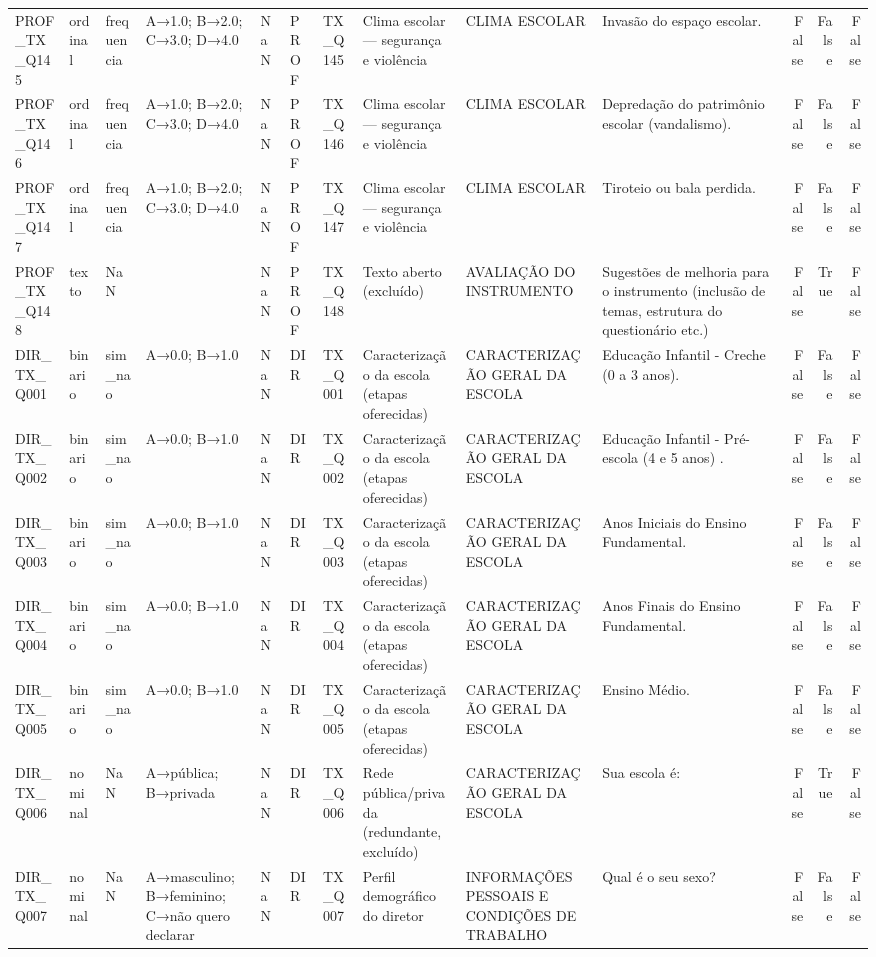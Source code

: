 \begin{tabular}{llllllllllrrr}
PROF\_TX\_Q145 & ordinal & frequencia & A→1.0; B→2.0; C→3.0; D→4.0 & NaN & PROF & TX\_Q145 & Clima escolar — segurança e violência & CLIMA ESCOLAR & Invasão do espaço escolar. & False & False & False \\
PROF\_TX\_Q146 & ordinal & frequencia & A→1.0; B→2.0; C→3.0; D→4.0 & NaN & PROF & TX\_Q146 & Clima escolar — segurança e violência & CLIMA ESCOLAR & Depredação do patrimônio escolar (vandalismo). & False & False & False \\
PROF\_TX\_Q147 & ordinal & frequencia & A→1.0; B→2.0; C→3.0; D→4.0 & NaN & PROF & TX\_Q147 & Clima escolar — segurança e violência & CLIMA ESCOLAR & Tiroteio ou bala perdida. & False & False & False \\
PROF\_TX\_Q148 & texto & NaN &  & NaN & PROF & TX\_Q148 & Texto aberto (excluído) & AVALIAÇÃO DO INSTRUMENTO & Sugestões de melhoria para o instrumento (inclusão de temas, estrutura do questionário etc.) & False & True & False \\
DIR\_TX\_Q001 & binario & sim\_nao & A→0.0; B→1.0 & NaN & DIR & TX\_Q001 & Caracterização da escola (etapas oferecidas) & CARACTERIZAÇÃO GERAL DA ESCOLA & Educação Infantil  -  Creche  (0 a 3 anos). & False & False & False \\
DIR\_TX\_Q002 & binario & sim\_nao & A→0.0; B→1.0 & NaN & DIR & TX\_Q002 & Caracterização da escola (etapas oferecidas) & CARACTERIZAÇÃO GERAL DA ESCOLA & Educação Infantil  -  Pré-escola  (4 e 5 anos) . & False & False & False \\
DIR\_TX\_Q003 & binario & sim\_nao & A→0.0; B→1.0 & NaN & DIR & TX\_Q003 & Caracterização da escola (etapas oferecidas) & CARACTERIZAÇÃO GERAL DA ESCOLA & Anos Iniciais do Ensino Fundamental. & False & False & False \\
DIR\_TX\_Q004 & binario & sim\_nao & A→0.0; B→1.0 & NaN & DIR & TX\_Q004 & Caracterização da escola (etapas oferecidas) & CARACTERIZAÇÃO GERAL DA ESCOLA & Anos Finais do Ensino Fundamental. & False & False & False \\
DIR\_TX\_Q005 & binario & sim\_nao & A→0.0; B→1.0 & NaN & DIR & TX\_Q005 & Caracterização da escola (etapas oferecidas) & CARACTERIZAÇÃO GERAL DA ESCOLA & Ensino Médio. & False & False & False \\
DIR\_TX\_Q006 & nominal & NaN & A→pública; B→privada & NaN & DIR & TX\_Q006 & Rede pública/privada (redundante, excluído) & CARACTERIZAÇÃO GERAL DA ESCOLA & Sua escola é: & False & True & False \\
DIR\_TX\_Q007 & nominal & NaN & A→masculino; B→feminino; C→não quero declarar & NaN & DIR & TX\_Q007 & Perfil demográfico do diretor & INFORMAÇÕES PESSOAIS E CONDIÇÕES DE TRABALHO & Qual é o seu sexo? & False & False & False \\

\end{tabular}
